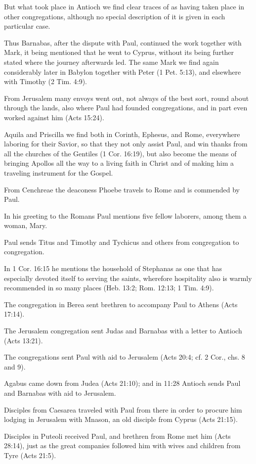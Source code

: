 But what took place in Antioch we find clear traces of as having taken place in other congregations, although no special description of it is given in each particular case.

Thus Barnabas, after the dispute with Paul, continued the work together with Mark, it being mentioned that he went to Cyprus, without its being further stated where the journey afterwards led. The same Mark we find again considerably later in Babylon together with Peter (1 Pet. 5:13), and elsewhere with Timothy (2 Tim. 4:9).

From Jerusalem many envoys went out, not always of the best sort, round about through the lands, also where Paul had founded congregations, and in part even worked against him (Acts 15:24).

Aquila and Priscilla we find both in Corinth, Ephesus, and Rome, everywhere laboring for their Savior, so that they not only assist Paul, and win thanks from all the churches of the Gentiles (1 Cor. 16:19), but also become the means of bringing Apollos all the way to a living faith in Christ and of making him a traveling instrument for the Gospel.

From Cenchreae the deaconess Phoebe travels to Rome and is commended by Paul.

In his greeting to the Romans Paul mentions five fellow laborers, among them a woman, Mary.

Paul sends Titus and Timothy and Tychicus and others from congregation to congregation.

In 1 Cor. 16:15 he mentions the household of Stephanas as one that has especially devoted itself to serving the saints, wherefore hospitality also is warmly recommended in so many places (Heb. 13:2; Rom. 12:13; 1 Tim. 4:9).

The congregation in Berea sent brethren to accompany Paul to Athens (Acts 17:14).

The Jerusalem congregation sent Judas and Barnabas with a letter to Antioch (Acts 13:21).

The congregations sent Paul with aid to Jerusalem (Acts 20:4; cf. 2 Cor., chs. 8 and 9).

Agabus came down from Judea (Acts 21:10); and in 11:28 Antioch sends Paul and Barnabas with aid to Jerusalem.

Disciples from Caesarea traveled with Paul from there in order to procure him lodging in Jerusalem with Mnason, an old disciple from Cyprus (Acts 21:15).

Disciples in Puteoli received Paul, and brethren from Rome met him (Acts 28:14), just as the great companies followed him with wives and children from Tyre (Acts 21:5).

